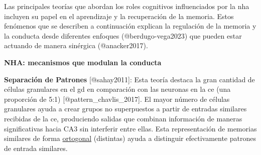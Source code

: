 \documentclass[
  11pt]{../MastersDoctoralThesisUNAM}
\begin{document}
Las principales teorías que abordan los roles cognitivos influenciados
por la \ac{nha} incluyen su papel en el aprendizaje y la recuperación de
la memoria. Estos fenómenos que se describen a continuación explican la
regulación de la memoria y la conducta desde diferentes enfoques
(@berdugo-vega2023) que pueden estar actuando de manera sinérgica
(@anacker2017).

\begin{tcolorbox}[enhanced jigsaw, colframe=quarto-callout-warning-color-frame, left=2mm, bottomrule=.15mm, rightrule=.15mm, arc=.35mm, toprule=.15mm, leftrule=.75mm, breakable, opacityback=0, colback=white]

\vspace{-3mm}\textbf{\textbf{NHA: mecanismos que modulan la conducta}}\vspace{3mm}

\textbf{Separación de Patrones} {[}@sahay2011{]}: Esta teoría destaca la
gran cantidad de células granulares en el \ac{gd} en comparación con las
neuronas en la \ac{ce} (una proporción de 5:1)
{[}@pattern\_chavlis\_2017{]}. El mayor número de células granulares
ayuda a crear grupos no superpuestos a partir de entradas similares
recibidas de la \ac{ce}, produciendo salidas que combinan información de
maneras significativas hacia CA3 sin interferir entre ellas. Esta
representación de memorias similares de forma
\href{AppendixB.qmd\#term-id-7}{ortogonal} (distintas) ayuda a
distinguir efectivamente patrones de entrada similares.

\begin{figure}[H]

\begin{minipage}{0.50\linewidth}

\begin{figure}[H]

\end{figure}
\end{minipage}
\end{figure}
\end{tcolorbox}
\end{document}
